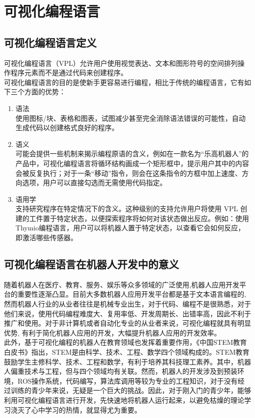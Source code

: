 \documentclass[11pt]{article}
\begin{document}
\section{可视化编程语言}
\subsection{可视化编程语言定义}
可视化编程语言（VPL）允许用户使用视觉表达、文本和图形符号的空间排列操作程序元素而不是通过代码来创建程序。\\
可视化编程语言的目的是使新手更容易进行编程，相比于传统的编程语言，它有如下三个方面的优势：
\begin{enumerate}[$\bullet$]
    \item 语法\\
    使用图标/块、表格和图表，试图减少甚至完全消除语法错误的可能性，自动生成代码以创建格式良好的程序。
    \item 语义\\
    可能会提供一些机制来揭示编程原语的含义，例如在一款名为``乐高机器人''的产品中，可视化编程语言将循环结构画成一个矩形框中，提示用户其中的内容会被反复执行；对于一条``移动''指令，则会在这条指令的方框中加上速度、方向选项，用户可以直接勾选而无需使用代码指定。
    \item 语用学\\
    支持研究程序在特定情况下的含义。这种级别的支持允许用户将使用 VPL
  创建的工件置于特定状态，以便探索程序将如何对该状态做出反应。例如：使用Thymio编程语言，用户可以将机器人置于特定状态，以查看它会如何反应，即激活哪些传感器。
\end{enumerate}
\subsection{可视化编程语言在机器人开发中的意义}
随着机器人在医疗、教育、服务、娱乐等众多领域的广泛使用,机器人应用开发平台的重要性逐渐凸显。目前大多数机器人应用开发平台都是基于文本语言编程的,
然而机器人行业的从业者往往是机械专业出生，对于代码、编程不是很熟悉，对于他们来说，使用代码编程难度大、复用率低、开发周期长、出错率高，因此不利于推广和使用。对于非计算机或者自动化专业的从业者来说，可视化编程就具有明显优势,
有利于简化机器人应用的开发，大幅提升机器人应用的开发效率。\\
此外，基于可视化编程的机器人在教育领域也发挥着重要作用，《中国STEM教育白皮书》指出，STEM是由科学、技术、工程、数学四个领域构成的。STEM教育鼓励学生主修科学、技术、工程和数学，有利于培养其科技理工素养。其中，机器人偏重技术与工程，但与四个领域均有关联。然而，机器人的开发涉及到预装环境，ROS操作系统，代码编写，算法库调用等较为专业的工程知识，对于没有经过训练的青少年来说，无疑是一个巨大的挑战。因此，对于刚入门的青少年，能够利用可视化编程语言进行开发，先快速地将机器人运行起来，以避免枯燥的理论学习浇灭了心中学习的热情，就显得尤为重要。
\end{document}
